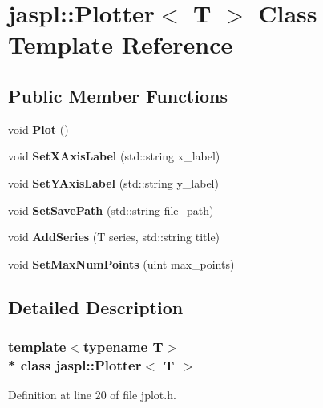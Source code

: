 \hypertarget{classjaspl_1_1_plotter}{}\section{jaspl\+:\+:Plotter$<$ T $>$ Class Template Reference}
\label{classjaspl_1_1_plotter}
\subsection*{Public Member Functions}
\begin{DoxyCompactItemize}
\item 
void {\bfseries Plot} ()\hypertarget{classjaspl_1_1_plotter_a2bf19310ad5f950c5779a7a94738a186}{}\label{classjaspl_1_1_plotter_a2bf19310ad5f950c5779a7a94738a186}

\item 
void {\bfseries Set\+X\+Axis\+Label} (std\+::string x\+\_\+label)\hypertarget{classjaspl_1_1_plotter_ac456827d783af794673e18d24758512b}{}\label{classjaspl_1_1_plotter_ac456827d783af794673e18d24758512b}

\item 
void {\bfseries Set\+Y\+Axis\+Label} (std\+::string y\+\_\+label)\hypertarget{classjaspl_1_1_plotter_af2fe690d3e8dd14374ef67de010c60f2}{}\label{classjaspl_1_1_plotter_af2fe690d3e8dd14374ef67de010c60f2}

\item 
void {\bfseries Set\+Save\+Path} (std\+::string file\+\_\+path)\hypertarget{classjaspl_1_1_plotter_a68f0532d49ea6673ff4ae666f95dc5d9}{}\label{classjaspl_1_1_plotter_a68f0532d49ea6673ff4ae666f95dc5d9}

\item 
void {\bfseries Add\+Series} (T series, std\+::string title)\hypertarget{classjaspl_1_1_plotter_a61783f71df3253ed393d16ba98b304c2}{}\label{classjaspl_1_1_plotter_a61783f71df3253ed393d16ba98b304c2}

\item 
void {\bfseries Set\+Max\+Num\+Points} (uint max\+\_\+points)\hypertarget{classjaspl_1_1_plotter_a382677a28083b7bd1a86f045ae721424}{}\label{classjaspl_1_1_plotter_a382677a28083b7bd1a86f045ae721424}

\end{DoxyCompactItemize}


\subsection{Detailed Description}
\subsubsection*{template$<$typename T$>$\\*
class jaspl\+::\+Plotter$<$ T $>$}



Definition at line 20 of file jplot.\+h.

